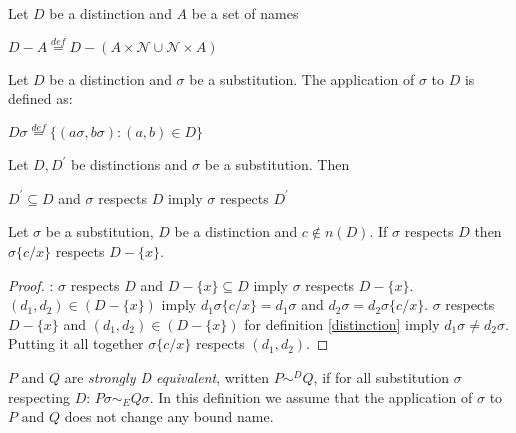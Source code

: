 \begin{definition}
  Let $D$ be a distinction and $A$ be a set of names
  \begin{center}
    $D-A \stackrel{def}{=} D - (A\times \mathcal{N} \cup \mathcal{N} \times A)$
  \end{center}
\end{definition}

\begin{definition}
  Let $D$ be a distinction and $\sigma$ be a substitution. The application of $\sigma$ to $D$ is defined as:
  \begin{center}
    $D\sigma \stackrel{def}{=} \{(a\sigma,b\sigma): (a,b)\in D\}$
  \end{center}
\end{definition}

\begin{proposition}
  Let $D,D^{'}$ be distinctions and $\sigma$ be a substitution. Then
  \begin{center}
    $D^{'}\subseteq D$ and $\sigma$ respects $D$ imply $\sigma$ respects $D^{'}$
  \end{center}
\end{proposition}


\begin{lemma}\label{distinctionSubstitution}
  Let $\sigma$ be a substitution, $D$ be a distinction and $c\notin n(D)$. If $\sigma$ respects $D$ then $\sigma\{c/x\}$ respects $D-\{x\}$.
  \begin{proof}:
    $\sigma$ respects $D$ and $D-\{x\}\subseteq D$ imply $\sigma$ respects $D-\{x\}$. $(d_{1},d_{2}) \in (D-\{x\})$ imply $d_{1} \sigma\{c/x\} = d_{1} \sigma$ and $d_{2} \sigma = d_{2} \sigma\{c/x\}$. $\sigma$ respects $D-\{x\}$ and $(d_{1},d_{2}) \in (D-\{x\})$ for definition \ref{distinction} imply $d_{1} \sigma \neq d_{2} \sigma$.  Putting it all together $\sigma \{c/x\}$ respects $(d_{1}, d_{2})$.
  \end{proof}
\end{lemma}


\begin{definition}\label{strongDequivalence}
  $P$ and $Q$ are \emph{strongly D equivalent}, written $P \sim^{D} Q$, if for all substitution $\sigma$ respecting $D$: $P\sigma \sim_{E} Q\sigma$. In this definition we assume that the application of $\sigma$ to $P$ and $Q$ does not change any bound name.
\end{definition}

